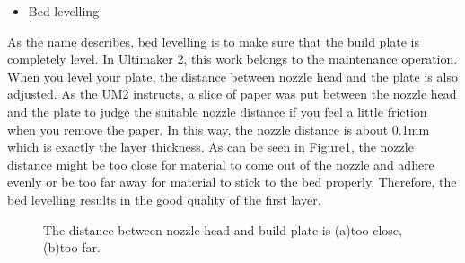 \begin{itemize}
\item Bed levelling
\end{itemize}
As the name describes, bed levelling is to make sure that the build plate is completely level. In Ultimaker 2, this work belongs to the maintenance operation. When you level your plate, the distance between nozzle head and the plate is also adjusted.  As the UM2 instructs, a slice of paper was put between the nozzle head and the plate to judge the suitable nozzle distance if you feel a little friction when you remove the paper. In this way, the nozzle distance is about 0.1mm which is exactly the layer thickness. As can be seen in Figure\ref{Fig:bed}, the nozzle distance might be too close for material to come out of the nozzle and adhere evenly or be too far away for material to stick to the bed properly. Therefore, the bed levelling results in the good quality of the first layer.

\begin{figure}[htbp] %
	\centering

  \caption[The distance between nozzle head and build plate]{\footnotesize The distance between nozzle head and build plate is (a)too close, (b)too far.}
  \label{Fig:bed}
\end{figure}

